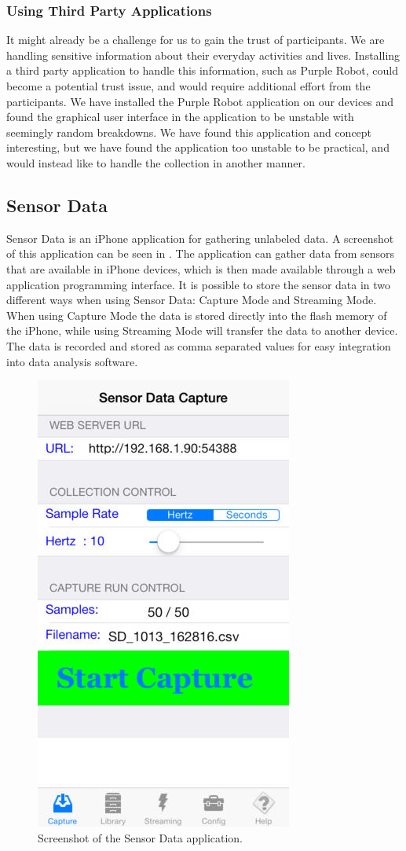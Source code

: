 \subsubsection{Using Third Party Applications}
It might already be a challenge for us to gain the trust of participants. We are handling sensitive information about their everyday activities and lives. Installing a third party application to handle this information, such as Purple Robot, could become a potential trust issue, and would require additional effort from the participants. We have installed the Purple Robot application on our devices and found the graphical user interface in the application to be unstable with seemingly random breakdowns. We have found this application and concept interesting, but we have found the application too unstable to be practical, and would instead like to handle the collection in another manner. 

\subsection{Sensor Data}
\label{sub:sensor_data}
Sensor Data is an iPhone application for gathering unlabeled data. A screenshot of this application can be seen in . The application can gather data from sensors that are available in iPhone devices, which is then made available through a web application programming interface. It is possible to store the sensor data in two different ways when using Sensor Data: Capture Mode and Streaming Mode. When using Capture Mode the data is stored directly into the flash memory of the iPhone, while using Streaming Mode will transfer the data to another device. The data is recorded and stored as comma separated values for easy integration into data analysis software.

\begin{figure}[!htbp]
	\centering
	\includegraphics[height=0.5\textwidth]{graphic/existing_solutions/sensor_data}
	\caption[]{Screenshot of the Sensor Data application\parencite{sensor_data_app_itunes}.}
	\label{fig:sensor_data_screenshot}
\end{figure}
\FloatBarrier

